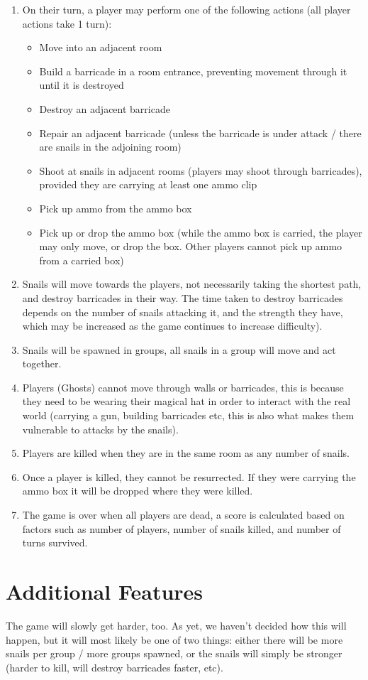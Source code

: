 \documentclass[a4wide, 11pt]{article}
\begin{document}
\begin{enumerate}
	\item On their turn, a player may perform one of the following actions (all player actions take 1 turn):
		\begin{itemize}
			\item Move into an adjacent room
			\item Build a barricade in a room entrance, preventing movement through it until it is destroyed
			\item Destroy an adjacent barricade
			\item Repair an adjacent barricade (unless the barricade is under attack / there are snails in the adjoining room)
			\item Shoot at snails in adjacent rooms (players may shoot through barricades), provided they are carrying at least one ammo clip
			\item Pick up ammo from the ammo box
			\item Pick up or drop the ammo box (while the ammo box is carried, the player may only move, or drop the box. Other players cannot pick up ammo from a carried box)
		\end{itemize}
	\item Snails will move towards the players, not necessarily taking the shortest path, and destroy barricades in their way. The time taken to destroy barricades depends on the number of snails attacking it, and the strength they have, which may be increased as the game continues to increase difficulty).
	\item Snails will be spawned in groups, all snails in a group will move and act together.
	\item Players (Ghosts) cannot move through walls or barricades, this is because they need to be wearing their magical hat in order to interact with the real world (carrying a gun, building barricades etc, this is also what makes them vulnerable to attacks by the snails).
	\item Players are killed when they are in the same room as any number of snails.
	\item Once a player is killed, they cannot be resurrected. If they were carrying the ammo box it will be dropped where they were killed.
	\item The game is over when all players are dead, a score is calculated based on factors such as number of players, number of snails killed, and number of turns survived.
\end{enumerate}


\section{Additional Features}

The game will slowly get harder, too. As yet, we haven’t decided how this will happen, but it will most likely be one of two things: either there will be more snails per group / more groups spawned, or the snails will simply be stronger (harder to kill, will destroy barricades faster, etc).
\end{document}

